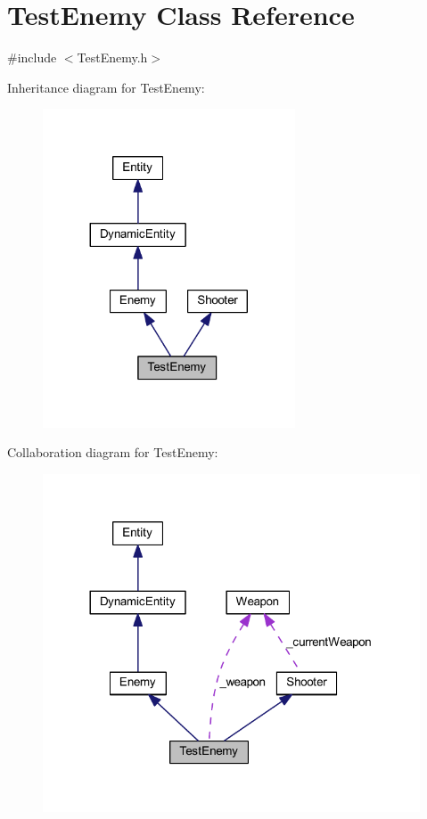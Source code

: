 \hypertarget{class_test_enemy}{
\section{TestEnemy Class Reference}
\label{dd/d78/class_test_enemy}
}


{\ttfamily \#include $<$TestEnemy.h$>$}



Inheritance diagram for TestEnemy:
\nopagebreak
\begin{figure}[H]
\begin{center}
\leavevmode
\includegraphics[width=212pt]{df/d9a/class_test_enemy__inherit__graph}
\end{center}
\end{figure}


Collaboration diagram for TestEnemy:
\nopagebreak
\begin{figure}[H]
\begin{center}
\leavevmode
\includegraphics[width=317pt]{de/d82/class_test_enemy__coll__graph}
\end{center}
\end{figure}
